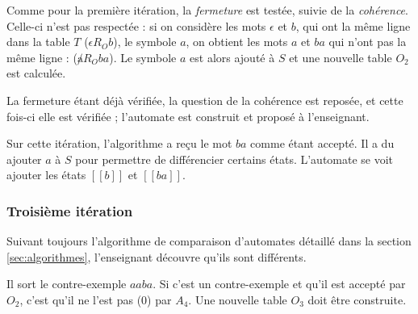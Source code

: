 \vspace{1cm}
Comme pour la première itération, la \emph{fermeture} est testée, suivie de la \emph{cohérence}. Celle-ci n'est pas respectée : si on considère les mots $\epsilon$ et $b$, qui ont la même ligne dans la table $T$ ($\epsilon R_O b$), le symbole $a$, on obtient les mots $a$ et $ba$ qui n'ont pas la même ligne : ($\not a R_O ba$). Le symbole $a$ est alors ajouté à $S$ et une nouvelle table $O_2$ est calculée.

La fermeture étant déjà vérifiée, la question de la cohérence est reposée, et cette fois-ci elle est vérifiée ; l'automate est construit et proposé à l'enseignant.

Sur cette itération, l'algorithme a reçu le mot $ba$ comme étant accepté. Il a du ajouter $a$ à $S$ pour permettre de différencier certains états. L'automate se voit ajouter les états $[[b]]$ et $[[ba]]$.

\subsubsection{Troisième itération}

Suivant toujours l'algorithme de comparaison d'automates détaillé dans la section \ref{sec:algorithmes}, l'enseignant découvre qu'ils sont différents.

Il sort le contre-exemple $aaba$. Si c'est un contre-exemple et qu'il est accepté par $O_2$, c'est qu'il ne l'est pas (0) par $A_4$. Une nouvelle table $O_3$ doit être construite.

